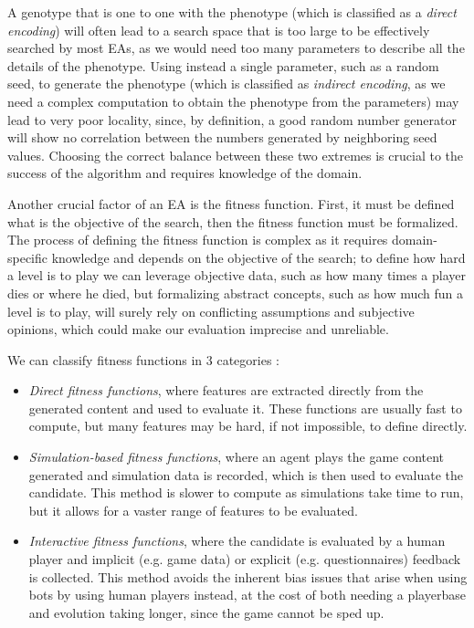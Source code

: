 A genotype that is one to one with the phenotype (which is classified as a \textit{direct encoding}) will often lead to a search space that is too large to be effectively searched by most EAs, as we would need too many parameters to describe all the details of the phenotype. Using instead a single parameter, such as a random seed, to generate the phenotype (which is classified as \textit{indirect encoding}, as we need a complex computation to obtain the phenotype from the parameters) may lead to very poor locality, since, by definition, a good random number generator will show no correlation between the numbers generated by neighboring seed values. Choosing the correct balance between these two extremes is crucial to the success of the algorithm and requires knowledge of the domain. \cite{togelius_search-based_2010}

Another crucial factor of an EA is the fitness function. First, it must be defined what is the objective of the search, then the fitness function must be formalized. The process of defining the fitness function is complex as it requires domain-specific knowledge and depends on the objective of the search; to define how hard a level is to play we can leverage objective data, such as how many times a player dies or where he died, but formalizing abstract concepts, such as how much fun a level is to play, will surely rely on conflicting assumptions and subjective opinions, which could make our evaluation imprecise and unreliable. \cite{togelius_search-based_2010}

We can classify fitness functions in 3 categories \cite{togelius_search-based_2010}:
\begin{itemize}
    \item \textit{Direct fitness functions}, where features are extracted directly from the generated content and used to evaluate it. These functions are usually fast to compute, but many features may be hard, if not impossible, to define directly.
    \item \textit{Simulation-based fitness functions}, where an agent plays the game content generated and simulation data is recorded, which is then used to evaluate the candidate. This method is slower to compute as simulations take time to run, but it allows for a vaster range of features to be evaluated. 
    \item \textit{Interactive fitness functions}, where the candidate is evaluated by a human player and implicit (e.g. game data) or explicit (e.g. questionnaires) feedback is collected. This method avoids the inherent bias issues that arise when using bots by using human players instead, at the cost of both needing a playerbase and evolution taking longer, since the game cannot be sped up.  
\end{itemize}


